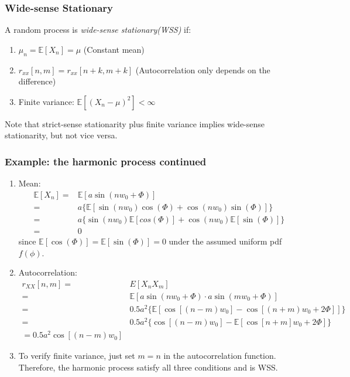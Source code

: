 \documentclass[12pt]{article}
\newcommand{\titc}[1]{\textit{\textcolor{blue1}{#1}}}
\newcommand{\mexp}{\mathbb{E}}
\newcommand{\autocox}{r_{xx}}
\begin{document}
\subsubsection{Wide-sense Stationary}
A random process is \titc{wide-sense stationary(WSS)} if:
\begin{enumerate}
    \item $\mu_n = \mexp[X_n]=\mu$ (Constant mean)
    \item $\autocox[n,m] = \autocox[n+k,m+k]$ (Autocorrelation only depends on the difference)
    \item Finite variance: $\mexp[(X_n - \mu)^2] < \infty$
\end{enumerate}
Note that strict-sense stationarity plus finite variance implies wide-sense stationarity, but not vice versa.

\subsubsection{Example: the harmonic process continued }
\begin{enumerate}
    \item Mean:
    \begin{align*}
        \mexp[X_n] = & \mexp[a\sin(n w_0 + \Phi)] \\
        = & a \{\mexp[\sin(n w_0)\cos(\Phi) + \cos(n w_0)\sin(\Phi)]\} \\
        = & a \{ \sin(n w_0) \mexp[cos(\Phi)] + \cos(n w_0) \mexp[\sin(\Phi)] \} \\
        = & 0
    \end{align*}
    since $\mexp[\cos(\Phi)] = \mexp[\sin(\Phi)] =0 $ under the assumed uniform pdf $f(\phi)$.
    \item Autocorrelation:
    \begin{align*}
        r_{XX}[n,m] = & E[X_n X_m] \\
        = & \mexp[a\sin(n w_0 + \Phi)\cdot a\sin(m w_0 + \Phi)] \\
        = & 0.5a^2\{\mexp[\cos[(n-m)w_0]-\cos[(n+m)w_0 + 2\Phi]]\} \\
        = & 0.5a^2 \{\cos[(n-m)w_0]-\mexp[\cos[n+m]w_0+2\Phi]\} \\
        = 0.5 a^2 \cos[(n-m)w_0]
    \end{align*}
    \item To verify finite variance, just set $m=n$ in the autocorrelation function. Therefore, the harmonic process satisfy all three conditions and is WSS.
\end{enumerate}
\end{document}
